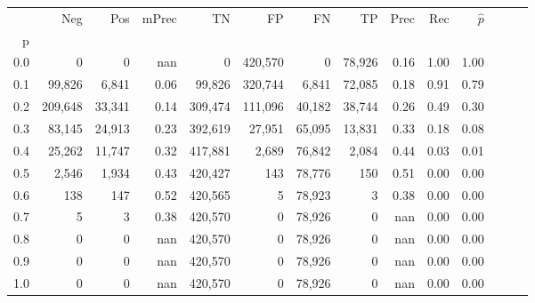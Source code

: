 \begin{tabular}{rrrrrrrrrrrrrr}
\toprule
{} &      Neg &     Pos & mPrec &       TN &       FP &      FN &      TP &  Prec &   Rec & $\hat{p}$ \\
p   &          &         &       &          &          &         &         &       &       &           \\
\midrule
0.0 &        0 &       0 &   nan &        0 &  420,570 &       0 &  78,926 &  0.16 &  1.00 &      1.00 \\
0.1 &   99,826 &   6,841 &  0.06 &   99,826 &  320,744 &   6,841 &  72,085 &  0.18 &  0.91 &      0.79 \\
0.2 &  209,648 &  33,341 &  0.14 &  309,474 &  111,096 &  40,182 &  38,744 &  0.26 &  0.49 &      0.30 \\
0.3 &   83,145 &  24,913 &  0.23 &  392,619 &   27,951 &  65,095 &  13,831 &  0.33 &  0.18 &      0.08 \\
0.4 &   25,262 &  11,747 &  0.32 &  417,881 &    2,689 &  76,842 &   2,084 &  0.44 &  0.03 &      0.01 \\
0.5 &    2,546 &   1,934 &  0.43 &  420,427 &      143 &  78,776 &     150 &  0.51 &  0.00 &      0.00 \\
0.6 &      138 &     147 &  0.52 &  420,565 &        5 &  78,923 &       3 &  0.38 &  0.00 &      0.00 \\
0.7 &        5 &       3 &  0.38 &  420,570 &        0 &  78,926 &       0 &   nan &  0.00 &      0.00 \\
0.8 &        0 &       0 &   nan &  420,570 &        0 &  78,926 &       0 &   nan &  0.00 &      0.00 \\
0.9 &        0 &       0 &   nan &  420,570 &        0 &  78,926 &       0 &   nan &  0.00 &      0.00 \\
1.0 &        0 &       0 &   nan &  420,570 &        0 &  78,926 &       0 &   nan &  0.00 &      0.00 \\
\bottomrule
\end{tabular}
